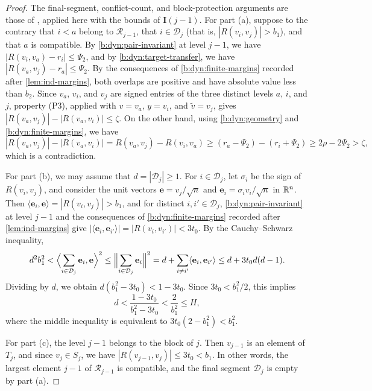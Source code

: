 \begin{proof}
The final-segment, conflict-count, and block-protection arguments are those
of \cite[Section~8.4, ``Conflicts occupy a bounded final segment'']{oai-barriers},
applied here with the bounds of $\mathbf I(j-1)$.
For part (a), suppose to the contrary that $i<a$ belong to $\mathcal R_{j-1}$, that $i\in \mathcal D_j$ (that is, $|R(v_i,v_j)|>b_1$), and that $a$ is compatible. By \eqref{b:dyn:pair-invariant} at level $j-1$, we have $|R(v_i,v_a)-r_i|\le\Psi_2$, and by \eqref{b:dyn:target-transfer}, we have $|R(v_a,v_j)-r_a|\le\Psi_2$. By the consequences of \eqref{b:dyn:finite-margins} recorded after \cref{lem:ind-margins}, both overlaps are positive and have absolute value less than $b_2$. Since $v_a$, $v_i$, and $v_j$ are signed entries of the three distinct levels $a$, $i$, and $j$, property (P3), applied with $v=v_a$, $y=v_i$, and ${\widetilde v}=v_j$, gives $|R(v_a,v_j)|-|R(v_a,v_i)|\le\zeta$. On the other hand, using \eqref{b:dyn:geometry} and \eqref{b:dyn:finite-margins}, we have
\[
 |R(v_a,v_j)|-|R(v_a,v_i)|=R(v_a,v_j)-R(v_i,v_a)\ge(r_a-\Psi_2)-(r_i+\Psi_2)\ge2\rho-2\Psi_2>\zeta,
\]
which is a contradiction.

For part (b), we may assume that $d=|\mathcal D_j|\ge1$. For $i\in \mathcal D_j$, let $\sigma_i$ be the sign of $R(v_i,v_j)$, and consider the unit vectors $\mathbf e=v_j/\sqrt n$ and $\mathbf e_i=\sigma_iv_i/\sqrt n$ in $\mathbb R^n$. Then $\langle\mathbf e_i,\mathbf e\rangle=|R(v_i,v_j)|>b_1$, and for distinct $i,i'\in \mathcal D_j$, \eqref{b:dyn:pair-invariant} at level $j-1$ and the consequences of \eqref{b:dyn:finite-margins} recorded after \cref{lem:ind-margins} give $|\langle\mathbf e_i,\mathbf e_{i'}\rangle|=|R(v_i,v_{i'})|<3t_0$. By the Cauchy--Schwarz inequality,
\[
 d^2b_1^2<\Bigl\langle\sum_{i\in \mathcal D_j}\mathbf e_i,\mathbf e\Bigr\rangle^2\le\Bigl\|\sum_{i\in \mathcal D_j}\mathbf e_i\Bigr\|^2
 =d+\sum_{i\neq i'}\langle\mathbf e_i,\mathbf e_{i'}\rangle\le d+3t_0d(d-1).
\]
Dividing by $d$, we obtain $d(b_1^2-3t_0)<1-3t_0$. Since $3t_0<b_1^2/2$, this implies
\[
 d<\frac{1-3t_0}{b_1^2-3t_0}<\frac2{b_1^2}\le H,
\]
where the middle inequality is equivalent to $3t_0(2-b_1^2)<b_1^2$.

For part (c), the level $j-1$ belongs to the block of $j$. Then $v_{j-1}$ is an element of $T_j$, and since $v_j\in S_j$, we have $|R(v_{j-1},v_j)|\le3t_0<b_1$. In other words, the largest element $j-1$ of $\mathcal R_{j-1}$ is compatible, and the final segment $\mathcal D_j$ is empty by part (a).


\end{proof}
